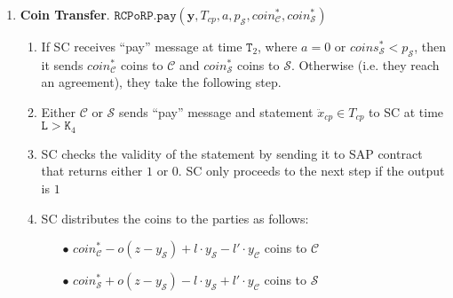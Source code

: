 \begin{enumerate}
\

\item \textbf{Coin Transfer}. \label{RCPoRP::CoinTransfer} $\mathtt{RCPoRP}.\mathtt{pay}(\bm{y},T_{\scriptscriptstyle cp},a,p_{\scriptscriptstyle\mathcal S}, coin^{\scriptscriptstyle *}_{\scriptscriptstyle\mathcal C},coin^{\scriptscriptstyle *}_{\scriptscriptstyle\mathcal S})$
\begin{enumerate}


 \item If SC  receives  ``pay'' message  at time $\texttt{T}_{\scriptscriptstyle 2}$, where $a=0$ or $coins^{\scriptscriptstyle *}_{\scriptscriptstyle\mathcal{S}}<p_{\scriptscriptstyle\mathcal{S}}$, then it sends $coin^{\scriptscriptstyle *}_{\scriptscriptstyle\mathcal C}$ coins to $\mathcal C$ and $coin^{\scriptscriptstyle *}_{\scriptscriptstyle\mathcal S}$ coins to $\mathcal S$. Otherwise (i.e. they reach an agreement), they take the following step. 

\item Either $\mathcal C$ or $\mathcal S$ sends ``pay'' message and  statement $\ddot{x}_{\scriptscriptstyle cp}\in T_{\scriptscriptstyle cp}$ to SC at time $\texttt{L}>\texttt{K}_{\scriptscriptstyle 4}$
\item SC checks the validity of the statement by sending it  to SAP contract that  returns  either $1$ or $0$. SC only proceeds to the next step if the output is $1$
\item SC distributes the coins to the parties as follows:

\begin{itemize}
\item[$\bullet$]   $coin^{\scriptscriptstyle *}_{\scriptscriptstyle\mathcal C}-o(z-y_{\scriptscriptstyle\mathcal S})+l\cdot y_{\scriptscriptstyle\mathcal S}-l'\cdot y_{\scriptscriptstyle\mathcal C}$ coins  to $\mathcal C$

\item[$\bullet$] $coin^{\scriptscriptstyle *}_{\scriptscriptstyle\mathcal S}+o(z-y_{\scriptscriptstyle\mathcal S})-l\cdot y_{\scriptscriptstyle\mathcal S}+l'\cdot y_{\scriptscriptstyle\mathcal C}$ coins to $\mathcal S$
\end{itemize}

\end{enumerate}
\end{enumerate}


